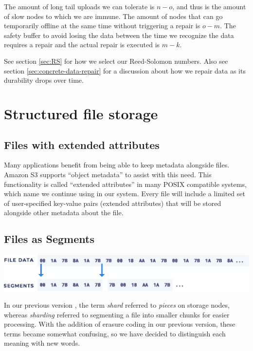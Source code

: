 \documentclass[8pt,fleqn,openany]{book}
\begin{document}
The amount of long tail uploads we can tolerate is $n-o$, and thus is the amount
of slow nodes to which we are immune.  The amount of nodes that can go
temporarily offline at the same time without triggering a repair is $o-m$. The
safety buffer to avoid losing the data between the time we recognize the data
requires a repair and the actual repair is executed is $m-k$.

See section \ref{sec:RS} for how we select our Reed-Solomon numbers.
Also see section \ref{sec:concrete-data-repair} for a discussion about
how we repair data as its durability drops over time.

\section{Structured file storage}\label{sec:structured-file-storage}

\subsection{Files with extended attributes}

Many applications benefit from being able to keep metadata alongside files.
Amazon S3 supports ``object metadata'' \cite{s3-object-meta} to assist with this
need. This functionality is called ``extended attributes'' in many POSIX
compatible systems, which name we continue using in our system.
Every file will include a limited set of user-specified key-value pairs
(extended attributes) that will be stored alongside other metadata about the
file.

\subsection{Files as Segments}\label{files-as-segments}

\begin{center}
\includegraphics[width=.9\textwidth]{images/stream-segment.eps}
\end{center}

In our previous version \cite{storj-v2}, the term {\em shard} referred to
{\em pieces} on storage nodes, whereas {\em sharding} referred to segmenting a file
into smaller chunks for easier processing. With the addition of erasure coding
in our previous version, these terms became somewhat confusing, so we have
decided to distinguish each meaning with new words.
\end{document}
